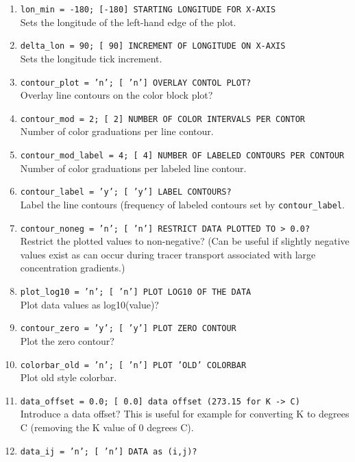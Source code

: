 \documentclass[11pt,fleqn]{book} %
\begin{document}
{\small \begin{enumerate}
\item \texttt{lon\_min = -180;         [-180]  STARTING LONGITUDE FOR X-AXIS}
\\ Sets the longitude of the left-hand edge of the plot.
\item \texttt{delta\_lon = 90;         [  90]  INCREMENT OF LONGITUDE ON X-AXIS}
\\ Sets the longitude tick increment.
\item \texttt{contour\_plot = 'n';     [ 'n']  OVERLAY CONTOL PLOT?}
\\ Overlay line contours on the color block plot?
\item \texttt{contour\_mod = 2;        [   2]  NUMBER OF COLOR INTERVALS PER CONTOR}
\\ Number of color graduations per line contour.
\item \texttt{contour\_mod\_label = 4;  [   4]  NUMBER OF LABELED CONTOURS PER CONTOUR}
\\ Number of color graduations per labeled line contour.
\item \texttt{contour\_label = 'y';    [ 'y']  LABEL CONTOURS?}
\\ Label the line contours (frequency of labeled contours set by \texttt{contour\_label}.
\item \texttt{contour\_noneg = 'n';    [ 'n']  RESTRICT DATA PLOTTED TO > 0.0?}
\\ Restrict the plotted values to non-negative? (Can be useful if slightly negative values exist as can occur during tracer transport associated with large concentration gradients.)
\item \texttt{plot\_log10 = 'n';       [ 'n']  PLOT LOG10 OF THE DATA}
\\ Plot data values as log10(value)?
\item \texttt{contour\_zero = 'y';     [ 'y']  PLOT ZERO CONTOUR}
\\ Plot the zero contour?
\item \texttt{colorbar\_old = 'n';     [ 'n']  PLOT 'OLD' COLORBAR}
\\ Plot old style colorbar.
\item \texttt{data\_offset = 0.0;      [ 0.0]  data offset (273.15 for K -> C)}
\\ Introduce a data offset? This is useful for example for converting K to degrees C (removing the K value of 0 degrees C).
\item \texttt{data\_ij = 'n';          [ 'n']  DATA as (i,j)?}

\end{enumerate}}
\end{document}
